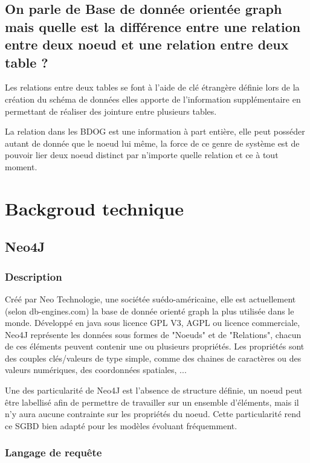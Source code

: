 \documentclass[a4paper,fleqn,12pt]{report}
\begin{document}
\section*{On parle de Base de donnée orientée graph mais quelle est la différence entre une relation entre deux noeud et une relation entre deux table ?}
Les relations entre deux tables se font à l'aide de clé étrangère définie lors de la création du schéma de données elles apporte de l'information supplémentaire en permettant de réaliser des jointure entre plusieurs tables. 

La relation dans les BDOG est une information à part entière, elle peut posséder autant de donnée que le noeud lui même, la force de ce genre de système est de pouvoir lier deux noeud distinct par n'importe quelle relation et ce à tout moment. 

\chapter{Backgroud technique}
\section{Neo4J}

\subsection{Description}

Créé par Neo Technologie, une sociétée suédo-américaine, elle est actuellement (selon db-engines.com) la base de donnée orienté graph la plus utilisée dans le monde. Développé en java sous licence GPL V3, AGPL ou licence commerciale, Neo4J représente les données sous formes de "Noeuds" et de "Relations", chacun de ces éléments peuvent contenir une ou plusieurs propriétés. Les propriétés sont des couples clés/valeurs de type simple, comme des chaines de caractères ou des valeurs numériques, des coordonnées spatiales, ... 

Une des particularité de Neo4J est l'absence de structure définie, un noeud peut être labellisé afin de permettre de travailler sur un ensemble d'éléments, mais il n'y aura aucune contrainte sur les propriétés du noeud. Cette particularité rend ce SGBD bien adapté pour les modèles évoluant fréquemment.

\subsection{Langage de requête}
\end{document}

